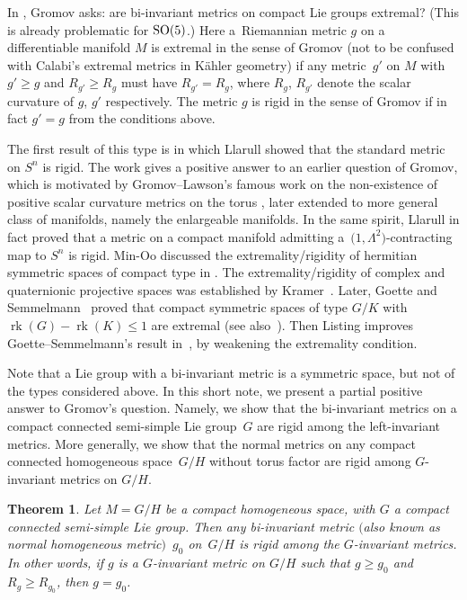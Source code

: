 \documentclass[pdftex]{sigma}
\newtheorem{Theorem}{Theorem}
\begin{document}
In \cite{2}, Gromov asks: are bi-invariant metrics on compact Lie groups extremal? (This is already problematic for ${\rm SO}(5)$.) Here a~Riemannian metric $g$ on a differentiable manifold $M$ is extremal in the sense of Gromov (not to be confused with Calabi's extremal metrics in K\"ahler geometry) if any metric~$g'$ on $M$ with $g' \geq g$ and $R_{g'} \geq R_{g}$ must have $R_{g'}= R_{g}$, where $R_g$, $R_{g'}$ denote the scalar curvature of $g$, $g'$ respectively. The metric $g$ is rigid in the sense of Gromov if in fact $g'=g$ from the conditions above.

The first result of this type is \cite{3} in which Llarull showed that the standard metric on $S^n$ is rigid. The work gives a positive answer to an earlier question of Gromov, which is motivated by Gromov--Lawson's famous work on the non-existence of positive scalar curvature metrics on the torus \cite{9}, later extended to more general class of manifolds, namely the enlargeable manifolds. In the same spirit, Llarull in fact proved that a metric on a compact manifold admitting a~$\big(1,\Lambda^2\big)$-contracting map to $S^{n}$ is rigid. Min-Oo discussed the extremality/rigidity of hermitian symmetric spaces of compact type in \cite{7}. The extremality/rigidity of complex and quaternionic projective spaces was established by Kramer~\cite{8}. Later, Goette and Semmel\-mann~\cite{6} proved that compact symmetric spaces of type $G/K$ with $\operatorname{rk}(G)-\operatorname{rk}(K)\leq 1$ are extremal (see also~\cite{16}). Then Listing improves Goette--Semmelmann's result in~\cite{4}, by weakening the extremality condition.

Note that a Lie group with a bi-invariant metric is a symmetric space, but not of the types considered above. In this short note, we present a partial positive answer to Gromov's question. Namely, we show that the bi-invariant metrics on a compact connected semi-simple Lie group~$G$ are rigid among the left-invariant metrics. More generally, we show that the normal metrics on any compact connected homogeneous space~$G/H$ without torus factor are rigid among $G$-invariant metrics on $G/H$.

\begin{Theorem}\label{main theorem}	Let $M=G/H$ be a compact homogeneous space, with $G$ a compact connected semi-simple Lie group. Then any bi-invariant metric $($also known as normal homogeneous metric$)$~$g_0$ on~$G/H$ is rigid among the $G$-invariant metrics. In other words, if $g$ is a $G$-invariant metric on $G/H$ such that $g\geq g_0$ and $R_g\geq R_{g_0}$, then $g=g_0$.
\end{Theorem}
\end{document}
